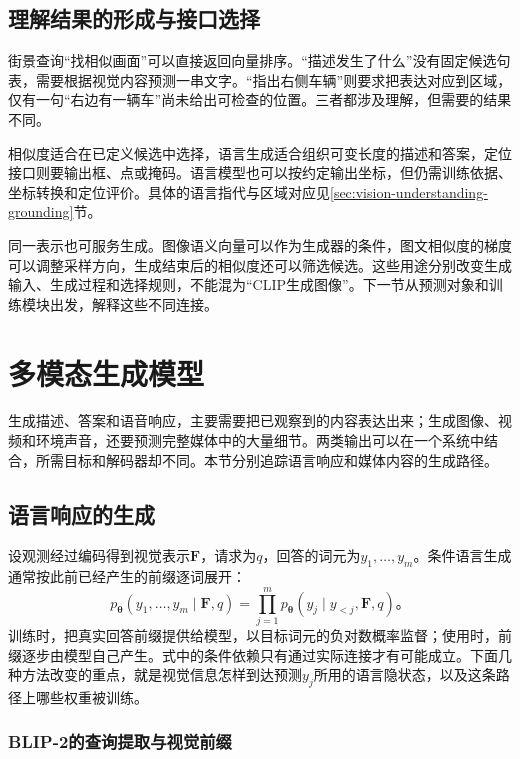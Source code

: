 \subsection{理解结果的形成与接口选择}
\label{sec:vision-models-understanding-interface}

街景查询“找相似画面”可以直接返回向量排序。“描述发生了什么”没有固定候选句表，需要根据视觉内容预测一串文字。“指出右侧车辆”则要求把表达对应到区域，仅有一句“右边有一辆车”尚未给出可检查的位置。三者都涉及理解，但需要的结果不同。

相似度适合在已定义候选中选择，语言生成适合组织可变长度的描述和答案，定位接口则要输出框、点或掩码。语言模型也可以按约定输出坐标，但仍需训练依据、坐标转换和定位评价。具体的语言指代与区域对应见\ref{sec:vision-understanding-grounding}节。

同一表示也可服务生成。图像语义向量可以作为生成器的条件，图文相似度的梯度可以调整采样方向，生成结束后的相似度还可以筛选候选。这些用途分别改变生成输入、生成过程和选择规则，不能混为“CLIP生成图像”。下一节从预测对象和训练模块出发，解释这些不同连接。

\section{多模态生成模型}
\label{sec:vision-models-generation}

生成描述、答案和语音响应，主要需要把已观察到的内容表达出来；生成图像、视频和环境声音，还要预测完整媒体中的大量细节。两类输出可以在一个系统中结合，所需目标和解码器却不同。本节分别追踪语言响应和媒体内容的生成路径。

\subsection{语言响应的生成}
\label{sec:vision-models-language-generation}

设观测经过编码得到视觉表示$\bm{F}$，请求为$q$，回答的词元为$y_1,\ldots,y_m$。条件语言生成通常按此前已经产生的前缀逐词展开：
\begin{equation}
  p_{\bm\theta}(y_1,\ldots,y_m\mid\bm F,q)
  =\prod_{j=1}^m p_{\bm\theta}(y_j\mid y_{<j},\bm F,q)\text{。}
  \label{eq:vision-vlm-language}
\end{equation}
训练时，把真实回答前缀提供给模型，以目标词元的负对数概率监督；使用时，前缀逐步由模型自己产生。式中的条件依赖只有通过实际连接才有可能成立。下面几种方法改变的重点，就是视觉信息怎样到达预测$y_j$所用的语言隐状态，以及这条路径上哪些权重被训练。

\subsubsection{BLIP-2的查询提取与视觉前缀}
\label{sec:vision-models-blip2}

